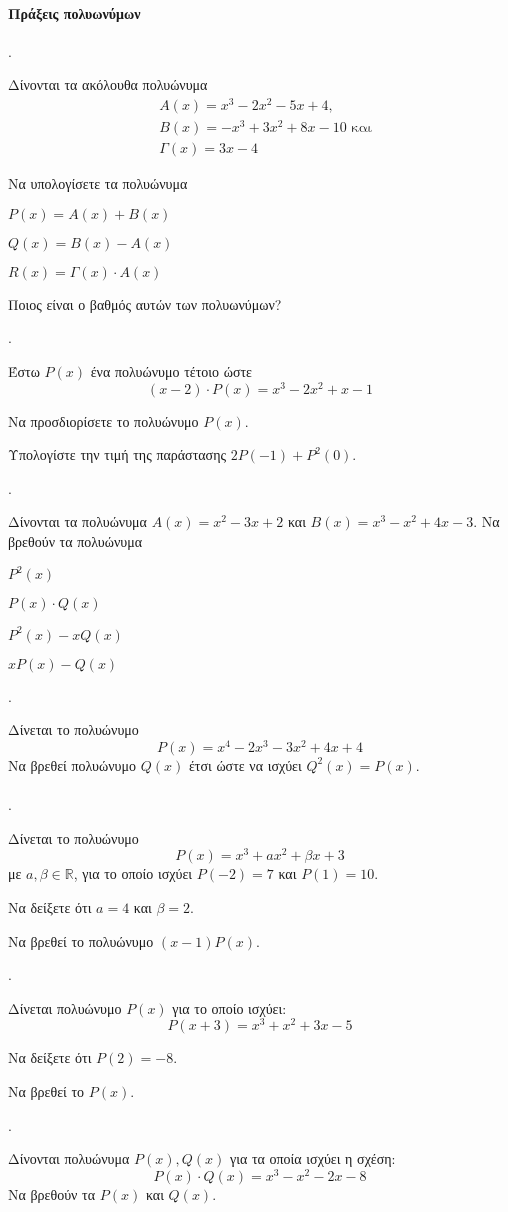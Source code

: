 \documentclass[11pt,a4paper,twocolumn]{article}
\newcounter{askhsh}
\newcommand{\askhsh}{{\large\theaskhsh.}\ \addtocounter{askhsh}{1}}
\begin{document}
\paragraph{Πράξεις πολυωνύμων}
\askhsh Δίνονται τα ακόλουθα πολυώνυμα 
\begin{align*}
&A(x)=x^3-2x^2-5x+4,\\&B(x)=-x^3+3x^2+8x-10 \text{ και} \\&\varGamma(x)=3x-4
\end{align*}
\begin{alist}
\item Να υπολογίσετε τα πολυώνυμα
\begin{rlist}
\item $P(x)=A(x)+B(x)$
\item $Q(x)=B(x)-A(x)$
\item $R(x)=\varGamma(x)\cdot A(x)$
\end{rlist}
\item Ποιος είναι ο βαθμός αυτών των πολυωνύμων?
\end{alist}
\askhsh Έστω $P(x)$ ένα πολυώνυμο τέτοιο ώστε 
\[ (x-2)\cdot P(x)=x^3-2x^2+x-1 \]
\begin{alist}
\item Να προσδιορίσετε το πολυώνυμο $P(x)$.
\item Υπολογίστε την τιμή της παράστασης $2P(-1)+P^2(0)$.
\end{alist}
\askhsh Δίνονται τα πολυώνυμα $A(x)=x^2-3x+2$ και $B(x)=x^3-x^2+4x-3$.
Να βρεθούν τα πολυώνυμα
\begin{multicols}{2}
\begin{alist}
\item $P^2(x)$
\item $P(x)\cdot Q(x)$
\item $P^2(x)-xQ(x)$
\item $xP(x)-Q(x)$
\end{alist}
\end{multicols}
\askhsh Δίνεται το πολυώνυμο \[ P(x)=x^4-2x^3-3x^2+4x+4 \] Να βρεθεί πολυώνυμο $ Q(x) $ έτσι ώστε να ισχύει $ Q^2(x)=P(x) $.\\\\
\askhsh Δίνεται το πολυώνυμο \[P(x)=x^3+ax^2+\beta x+3\]
με $a,\beta\in\mathbb{R}$, για το οποίο ισχύει $P(-2)=7$ και $P(1)=10$.
\begin{alist}
\item Να δείξετε ότι $a=4$ και $\beta=2$.
\item Να βρεθεί το πολυώνυμο $ (x-1)P(x) $.
\end{alist}
\askhsh Δίνεται πολυώνυμο $P(x)$ για το οποίο ισχύει:
\[ P(x+3)=x^3+x^2+3x-5 \]
\begin{alist}
\item Να δείξετε ότι $P(2)=-8$.
\item Να βρεθεί το $P(x)$.
\end{alist}
\askhsh Δίνονται πολυώνυμα $P(x),Q(x)$ για τα οποία ισχύει η σχέση:
\[ P(x)\cdot Q(x)=x^3-x^2-2x-8 \]
Να βρεθούν τα $P(x)$ και $Q(x)$.
\end{document}
